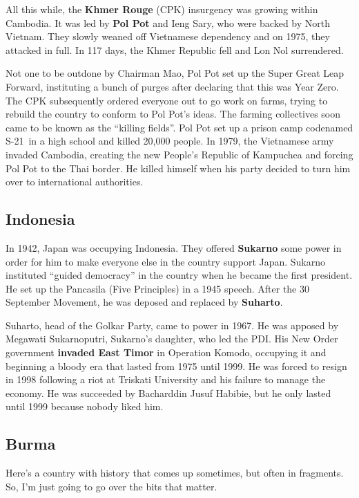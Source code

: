 All this while, the \textbf{Khmer Rouge} (CPK) insurgency was growing within Cambodia.
It was led by \textbf{Pol Pot} and Ieng Sary, who were backed by North Vietnam.
They slowly weaned off Vietnamese dependency and on 1975, they attacked in full.
In 117 days, the Khmer Republic fell and Lon Nol surrendered.

Not one to be outdone by Chairman Mao, Pol Pot set up the Super Great Leap Forward,
instituting a bunch of purges after declaring that this was Year Zero.
The CPK subsequently ordered everyone out to go work on farms,
trying to rebuild the country to conform to Pol Pot's ideas.
The farming collectives soon came to be known as the ``killing fields''.
Pol Pot set up a prison camp codenamed S-21\ in a high school and killed 20,000 people.
In 1979, the Vietnamese army invaded Cambodia,
creating the new People's Republic of Kampuchea and forcing Pol Pot to the Thai border.
He killed himself when his party decided to turn him over to international authorities.

\subsection*{Indonesia}

In 1942, Japan was occupying Indonesia.
They offered \textbf{Sukarno} some power in order for him to make everyone else in the country support Japan.
Sukarno instituted ``guided democracy'' in the country when he became the first president.
He set up the Pancasila (Five Principles) in a 1945 speech.
After the 30 September Movement, he was deposed and replaced by \textbf{Suharto}.

Suharto, head of the Golkar Party, came to power in 1967.
He was apposed by Megawati Sukarnoputri, Sukarno's daughter, who led the PDI\@.
His New Order government \textbf{invaded East Timor} in Operation Komodo,
occupying it and beginning a bloody era that lasted from 1975 until 1999.
He was forced to resign in 1998 following a riot at Triskati University and his failure to manage the economy.
He was succeeded by Bacharddin Jusuf Habibie, but he only lasted until 1999 because nobody liked him.

\subsection*{Burma}

Here's a country with history that comes up sometimes, but often in fragments.
So, I'm just going to go over the bits that matter.

